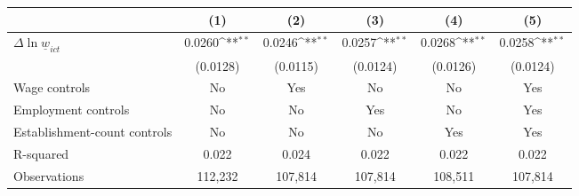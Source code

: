 {
\def\sym#1{\ifmmode^{#1}\else\(^{#1}\)\fi}
\begin{tabular}{l*{5}{c}}
\hline\hline
          &\multicolumn{1}{c}{(1)}         &\multicolumn{1}{c}{(2)}         &\multicolumn{1}{c}{(3)}         &\multicolumn{1}{c}{(4)}         &\multicolumn{1}{c}{(5)}         \\
\hline
$\Delta \ln \underline{w}_{ict}$&   0.0260\sym{**} &   0.0246\sym{**} &   0.0257\sym{**} &   0.0268\sym{**} &   0.0258\sym{**} \\
          & (0.0128)         & (0.0115)         & (0.0124)         & (0.0126)         & (0.0124)         \\
\hline
Wage controls&       No         &      Yes         &       No         &       No         &      Yes         \\
Employment controls&       No         &       No         &      Yes         &       No         &      Yes         \\
Establishment-count controls&       No         &       No         &       No         &      Yes         &      Yes         \\
R-squared &    0.022         &    0.024         &    0.022         &    0.022         &    0.022         \\
Observations&  112,232         &  107,814         &  107,814         &  108,511         &  107,814         \\
\hline\hline
\end{tabular}
}
